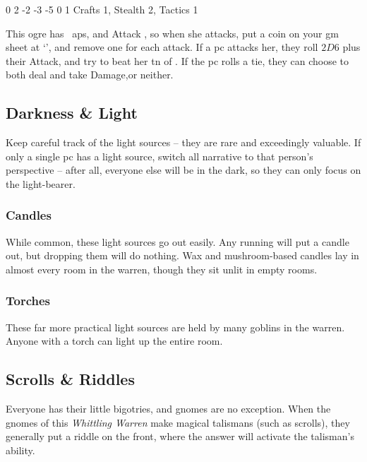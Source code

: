 \begin{multicols}{2}
{  
  {0}%
  {2}%
  {{-2}%
  {-3}%
  {-5}}%
  {0}%
  {1}%
  {Crafts 1, Stealth 2, Tactics 1}%
  {\Dagger}%
  {}

  This ogre has ~\glspl{ap}, and Attack , so when she attacks, put a coin on your \gls{gm} sheet at `', and remove one for each attack.
  If a \gls{pc} attacks her, they roll $2D6$ plus their Attack, and try to beat her \gls{tn} of .
  If the \gls{pc} rolls a tie, they can choose to both deal and take Damage,or neither.

}{}

\subsection{Darkness \& Light}

Keep careful track of the light sources -- they are rare and exceedingly valuable.
If only a single \gls{pc} has a light source, switch all narrative to that person's perspective -- after all, everyone else will be in the dark, so they can only focus on the light-bearer.

\subsubsection{Candles}

While common, these light sources go out easily.
Any running will put a candle out, but dropping them will do nothing.
Wax and mushroom-based candles lay in almost every room in the warren, though they sit unlit in empty rooms.

\subsubsection{Torches}

These far more practical light sources are held by many goblins in the warren.
Anyone with a torch can light up the entire room.

\subsection{Scrolls \& Riddles}
\label{scrollRiddles}

Everyone has their little bigotries, and gnomes are no exception.
When the gnomes of this \textit{Whittling Warren} make magical talismans (such as scrolls), they generally put a riddle on the front, where the answer will activate the talisman's ability.


\end{multicols}
